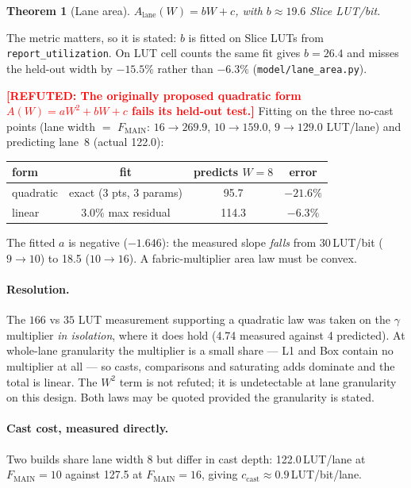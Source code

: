 \documentclass[11pt,a4paper]{article}
\newtheorem{theorem}{Theorem}
\newcommand{\refuted}[1]{\textcolor{red}{\textbf{[REFUTED: #1]}}}
\begin{document}
\begin{theorem}[Lane area]
$A_{\text{lane}}(W) = bW + c$, with $b \approx 19.6$ Slice LUT/bit.
\end{theorem}

The metric matters, so it is stated: $b$ is fitted on Slice LUTs from
\texttt{report\_utilization}. On LUT cell counts the same fit gives
$b = 26.4$ and misses the held-out width by $-15.5\%$ rather than $-6.3\%$
(\texttt{model/lane\_area.py}).

\refuted{The originally proposed quadratic form
$A(W) = aW^2 + bW + c$ fails its held-out test.} Fitting on the three
no-cast points (lane width $=$ $F_{\text{MAIN}}$: $16 \to 269.9$,
$10 \to 159.0$, $9 \to 129.0$ LUT/lane) and predicting lane~8 (actual 122.0):

\begin{table}[h]\centering
\begin{tabular}{lccc}
\toprule
form & fit & predicts $W\!=\!8$ & error \\
\midrule
quadratic & exact (3 pts, 3 params) & 95.7 & $-21.6\%$ \\
linear    & 3.0\% max residual      & 114.3 & $-6.3\%$ \\
\bottomrule
\end{tabular}
\end{table}

The fitted $a$ is negative ($-1.646$): the measured slope \emph{falls} from
30\,LUT/bit ($9\to10$) to 18.5 ($10\to16$). A fabric-multiplier area law must
be convex.

\paragraph{Resolution.} The $166$ vs $35$ LUT measurement supporting a
quadratic law was taken on the $\gamma$ multiplier \emph{in isolation}, where it
does hold (4.74 measured against 4 predicted). At whole-lane granularity the
multiplier is a small share --- L1 and Box contain no multiplier at all --- so
casts, comparisons and saturating adds dominate and the total is linear. The
$W^2$ term is not refuted; it is undetectable at lane granularity on this
design. Both laws may be quoted provided the granularity is stated.

\paragraph{Cast cost, measured directly.} Two builds share lane width 8 but
differ in cast depth: 122.0\,LUT/lane at $F_{\text{MAIN}} = 10$ against
127.5 at $F_{\text{MAIN}} = 16$, giving $c_{\text{cast}} \approx
0.9$\,LUT/bit/lane.
\end{document}
